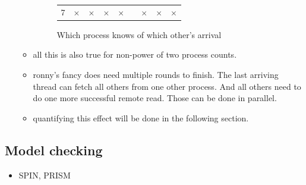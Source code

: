 \documentclass[a4paper, 10pt]{article}
\begin{document}
\begin{itemize}
\begin{itemize}
\begin{figure}[htbp]
\begin{minipage}[b]{0.4\linewidth}
{\begin{tabular}{c | c c c c c c c c}
								7 & $\times$ & $\times$ & $\times$ & $\times$ &   & $\times$ & $\times$ & $\times$ \\
							\end{tabular}
						}
					\end{minipage}
					\caption{Which process knows of which other's arrival}
					\label{fig:table-dissemination-progress}
				\end{figure}
			\item all this is also true for non-power of two process counts.
			\item ronny's fancy does need multiple rounds to finish. The last arriving thread can fetch all others from one other process. And all others need to do one more successful remote read. Those can be done in parallel.
			\item quantifying this effect will be done in the following section.
		\end{itemize}
\end{itemize}

\subsection{Model checking}
\label{ssec:analysis-modelchecking}
\begin{itemize}
	\item SPIN\cite{spin, hol97}, PRISM\cite{prism, knp09}
\end{itemize}

\end{document}
